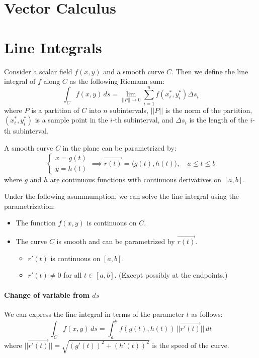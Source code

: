 \documentclass[11pt]{report}
\begin{document}
\section{Vector Calculus}
\section{Line Integrals}
\begin{definition}
    Consider a scalar field $f(x,y) $ and a smooth curve $C$. Then we define the line integral of $f$ along $C$ as the following Riemann sum:
    $$
        \int_C f(x,y) \, ds = \lim_{||P|| \to 0} \sum_{i=1}^n f(x_i^*, y_i^*) \Delta s_i
    $$
    where $P$ is a partition of $C$ into $n$ subintervals, $||P||$ is the norm of the partition, $(x_i^*, y_i^*)$ is a sample point in the $i$-th subinterval, and $\Delta s_i$ is the length of the $i$-th subinterval.
\end{definition}

\begin{definition}
    A smooth curve $C$ in the plane can be parametrized by:
    \begin{equation}
        \begin{cases}
            x = g(t) \\
            y = h(t)
        \end{cases} \implies \vec{r(t)} = \langle g(t), h(t) \rangle, \quad a \leq t \leq b
    \end{equation}
    where $g$ and $h$ are continuous functions with continuous derivatives on $[a,b]$.

    Under the following asummumption, we can solve the line integral using the parametrization:
    \begin{itemize}
        \item The function $f(x,y)$ is continuous on $C$.
        \item The curve $C$ is smooth and can be parametrized by $\vec{r(t)}$.
        \begin{itemize}
            \item $r'(t)$ is continuous on $[a,b]$.
            \item $r'(t) \neq 0$ for all $t \in [a,b]$. (Except possibly at the endpoints.) 
        \end{itemize}
    \end{itemize}
\end{definition}

\paragraph{Change of variable from $ds$} We can express the line integral in terms of the parameter $t$ as follows:
\begin{equation}
    \int_C f(x,y) \, ds = \int_a^b f(g(t), h(t)) \, ||\vec{r'(t)}|| \, dt
\end{equation}
where $||\vec{r'(t)}|| = \sqrt{(g'(t))^2 + (h'(t))^2}$ is the speed of the curve.
\end{document}
